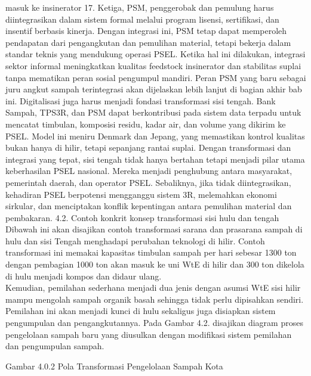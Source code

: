 \documentclass[
  letterpaper,
  DIV=11,
  numbers=noendperiod]{scrreprt}
\begin{document}
masuk ke insinerator 17. Ketiga, PSM, penggerobak dan pemulung harus
diintegrasikan dalam sistem formal melalui program lisensi, sertifikasi,
dan insentif berbasis kinerja. Dengan integrasi ini, PSM tetap dapat
memperoleh pendapatan dari pengangkutan dan pemulihan material, tetapi
bekerja dalam standar teknis yang mendukung operasi PSEL. Ketika hal ini
dilakukan, integrasi sektor informal meningkatkan kualitas feedstock
insinerator dan stabilitas suplai tanpa mematikan peran sosial pengumpul
mandiri. Peran PSM yang baru sebagai juru angkut sampah terintegrasi
akan dijelaskan lebih lanjut di bagian akhir bab ini. Digitalisasi juga
harus menjadi fondasi transformasi sisi tengah. Bank Sampah, TPS3R, dan
PSM dapat berkontribusi pada sistem data terpadu untuk mencatat
timbulan, komposisi residu, kadar air, dan volume yang dikirim ke PSEL.
Model ini meniru Denmark dan Jepang, yang memastikan kontrol kualitas
bukan hanya di hilir, tetapi sepanjang rantai suplai. Dengan
transformasi dan integrasi yang tepat, sisi tengah tidak hanya bertahan
tetapi menjadi pilar utama keberhasilan PSEL nasional. Mereka menjadi
penghubung antara masyarakat, pemerintah daerah, dan operator PSEL.
Sebaliknya, jika tidak diintegrasikan, kehadiran PSEL berpotensi
mengganggu sistem 3R, melemahkan ekonomi sirkular, dan menciptakan
konflik kepentingan antara pemulihan material dan pembakaran. 4.2.
Contoh konkrit konsep transformasi sisi hulu dan tengah Dibawah ini akan
disajikan contoh transformasi sarana dan prasarana sampah di hulu dan
sisi Tengah menghadapi perubahan teknologi di hilir. Contoh transformasi
ini memakai kapasitas timbulan sampah per hari sebesar 1300 ton dengan
pembagian 1000 ton akan masuk ke uni WtE di hilir dan 300 ton dikelola
di hulu menjadi kompos dan didaur ulang.\\
Kemudian, pemilahan sederhana menjadi dua jenis dengan asumsi WtE sisi
hilir mampu mengolah sampah organik basah sehingga tidak perlu
dipisahkan sendiri. Pemilahan ini akan menjadi kunci di hulu sekaligus
juga disiapkan sistem pengumpulan dan pengangkutannya. Pada Gambar 4.2.
disajikan diagram proses pengelolaan sampah baru yang diusulkan dengan
modifikasi sistem pemilahan dan pengumpulan sampah.

Gambar 4.0.2 Pola Transformasi Pengelolaan Sampah Kota
\end{document}
